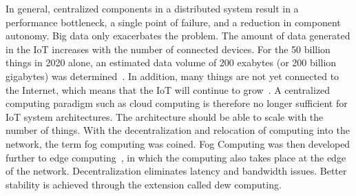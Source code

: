 \documentclass[english,version-2019-11]{uzl-thesis}
\begin{document}
In general, centralized components
in a distributed system result in a
performance bottleneck, a single point of failure,
and a reduction in component autonomy. Big data only exacerbates the
problem. The amount of data generated in the
IoT increases with the number of connected
devices. For the 50 billion things in
2020 alone, an estimated data volume
of 200 exabytes (or 200 billion gigabytes)
was determined~\cite{FogCloudBook}.
In addition, many things are not yet connected
to the Internet, which means that the IoT
will continue to grow~\cite{BookCisco}. 
A centralized computing paradigm such as cloud computing
is therefore no longer sufficient for IoT system architectures. The architecture
should be able to scale with the number of things.
With the decentralization and relocation of computing
into the network, the term fog computing was coined.
Fog Computing was then developed further
to edge computing~\cite{DewComp}, in which the computing also takes
place at the edge of the network.
Decentralization eliminates latency and bandwidth issues.
Better stability is achieved through the extension called dew computing.
\end{document}
